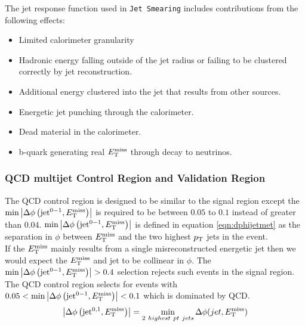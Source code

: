 \indent The jet response function used in {\tt Jet Smearing} includes contributions from the following effects: \\

\begin{itemize}
\item Limited calorimeter granularity
\item Hadronic energy falling outside of the jet radius or failing to be clustered correctly by jet reconstruction.
\item Additional energy clustered into the jet that results from other sources.
\item Energetic jet punching through the calorimeter.
\item Dead material in the calorimeter.
\item b-quark generating real $E_{\mathrm{T}}^{\mathrm{miss}}$ through decay to neutrinos.  
\end{itemize}

\subsubsection{QCD multijet Control Region and Validation Region}
\label{sec:QCD:CR}

\indent The QCD control region is designed to be similar to the signal region except the $\min \left|\Delta\phi\left(\mathrm{jet}^{0-1},E_{\mathrm{T}}^{\mathrm{miss}}\right)\right|$ is required to be between $0.05$ to $0.1$ instead of greater than $0.04$.  $\min \left|\Delta\phi\left(\mathrm{jet}^{0-1},E_{\mathrm{T}}^{\mathrm{miss}}\right)\right|$ is defined in equation \ref{eqn:dphijetmet} as the separation in $\phi$  between $E_{\mathrm{T}}^{\mathrm{miss}}$ and the two highest $p_{\mathrm{T}}$ jets in the event.  \\

\indent If the $E_{\mathrm{T}}^{\mathrm{miss}}$ mainly results from a single misreconstructed energetic jet then we would expect the $E_{\mathrm{T}}^{\mathrm{miss}}$ and jet to be collinear in $\phi$.  The $\min \left|\Delta\phi\left(\mathrm{jet}^{0-1},E_{\mathrm{T}}^{\mathrm{miss}}\right)\right| > 0.4$ selection rejects such events in the signal region.  The QCD control region selects for events with $0.05 < \min \left|\Delta\phi\left(\mathrm{jet}^{0-1},E_{\mathrm{T}}^{\mathrm{miss}}\right)\right| < 0.1$ which is dominated by QCD.  \\

\begin{equation}
\left|\Delta\phi\left(\mathrm{jet}^{0,1},E_{\mathrm{T}}^{\mathrm{miss}}\right)\right| = \min_{2~highest~pt~jets} \Delta \phi ( jet, E_{\mathrm{T}}^{\mathrm{miss}} ) 
\label{eqn:dphijetmet}
\end{equation}


